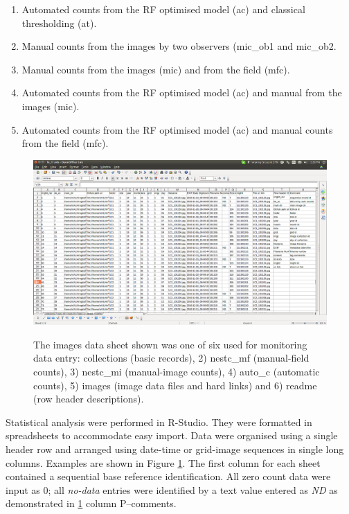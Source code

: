 \begin{enumerate}
\item Automated counts from the \ac{RF} optimised model (ac) and classical thresholding (at).
\item Manual counts from the images by two observers (mic\_ob1 and mic\_ob2.
\item Manual counts from the images (mic) and from the field (mfc).
\item Automated counts from the \ac{RF} optimised model (ac) and manual from the images (mic). 
\item Automated counts from the \ac{RF} optimised model (ac) and manual counts from the field (mfc). 
\end{enumerate}

\begin{figure}[!htbp]\myfloatalign
\includegraphics[width=1\linewidth]{gfx5/post/csv-data-imagefiles} \\
\caption[Image data files.]{The images data sheet shown was one of six used for monitoring data entry: collections (basic records), 2) nestc\_mf (manual-field counts), 3) nestc\_mi (manual-image counts), 4) auto\_c (automatic counts), 5) images (image data files and hard links) and 6) readme (row header descriptions).}\label{fig:data-entry}
\end{figure}

Statistical analysis were performed in R-Studio. They were formatted in spreadsheets to accommodate easy import. Data were organised using a single header row and arranged using date-time or grid-image sequences in single long columns. Examples are shown in Figure \ref{fig:data-entry}. The first column for each sheet contained a sequential base reference identification. All zero count data were input as $0$; all \emph{no-data} entries were identified by a text value entered as \emph{ND} as demonstrated in \ref{fig:data-entry} column P--comments.

